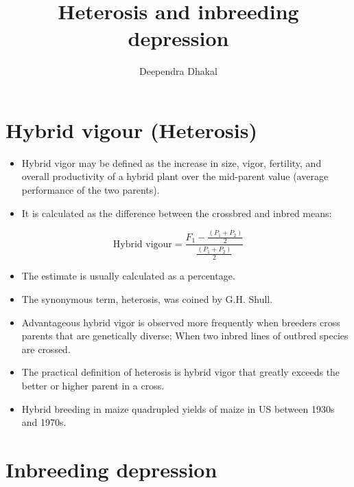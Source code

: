 \documentclass[11pt,ignorenonframetext,aspectratio=169]{beamer}
\title[]{Heterosis and inbreeding depression}
\author[
        Deependra Dhakal
    ]{Deependra Dhakal}
\institute[
    ]{
    Agriculture and Forestry University\\
\textit{ddhakal.rookie@gmail.com}\\
\url{https://rookie.rbind.io}
    }
\date[
      
  ]{
    }
\providecommand{\tightlist}{%
  \setlength{\itemsep}{0pt}\setlength{\parskip}{0pt}}
\begin{document}
  \begin{frame}[plain]
  \titlepage
  \end{frame}



\hypertarget{hybrid-vigour-heterosis}{%
\section{Hybrid vigour (Heterosis)}\label{hybrid-vigour-heterosis}}

\begin{frame}{}
\protect\hypertarget{section}{}
\begin{itemize}
\tightlist
\item
  Hybrid vigor may be defined as the increase in size, vigor, fertility,
  and overall productivity of a hybrid plant over the mid-parent value
  (average performance of the two parents).
\item
  It is calculated as the difference between the crossbred and inbred
  means:
\end{itemize}

\[\text{Hybrid vigour} = \frac{F_1-\frac{(P_1+P_2)}{2}}{\frac{(P_1+P_2)}{2}}\]

\begin{itemize}
\tightlist
\item
  The estimate is usually calculated as a percentage.
\item
  The synonymous term, heterosis, was coined by G.H. Shull.
\item
  Advantageous hybrid vigor is observed more frequently when breeders
  cross parents that are genetically diverse; When two inbred lines of
  outbred species are crossed.
\item
  The practical definition of heterosis is hybrid vigor that greatly
  exceeds the better or higher parent in a cross.
\item
  Hybrid breeding in maize quadrupled yields of maize in US between
  1930s and 1970s.
\end{itemize}
\end{frame}

\hypertarget{inbreeding-depression}{%
\section{Inbreeding depression}\label{inbreeding-depression}}
\end{document}
